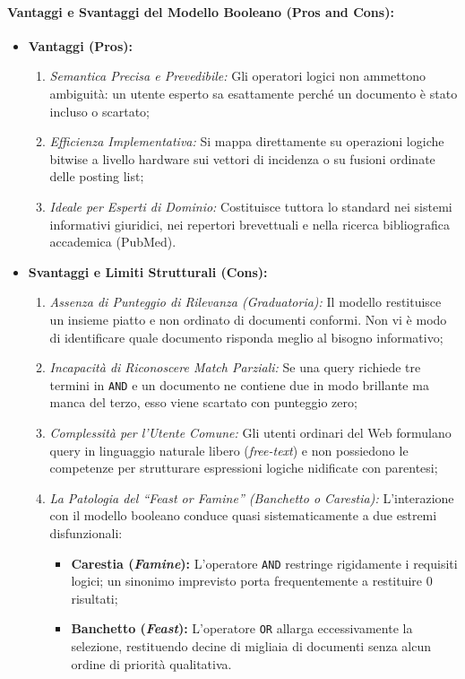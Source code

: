 \paragraph{Vantaggi e Svantaggi del Modello Booleano (Pros and Cons):}
\begin{itemize}
    \item \textbf{Vantaggi (Pros):}
    \begin{enumerate}
        \item \textit{Semantica Precisa e Prevedibile:} Gli operatori logici non ammettono ambiguit\`a: un utente esperto sa esattamente perch\'e un documento \`e stato incluso o scartato;
        \item \textit{Efficienza Implementativa:} Si mappa direttamente su operazioni logiche bitwise a livello hardware sui vettori di incidenza o su fusioni ordinate delle posting list;
        \item \textit{Ideale per Esperti di Dominio:} Costituisce tuttora lo standard nei sistemi informativi giuridici, nei repertori brevettuali e nella ricerca bibliografica accademica (PubMed).
    \end{enumerate}
    \item \textbf{Svantaggi e Limiti Strutturali (Cons):}
    \begin{enumerate}
        \item \textit{Assenza di Punteggio di Rilevanza (Graduatoria):} Il modello restituisce un insieme piatto e non ordinato di documenti conformi. Non vi \`e modo di identificare quale documento risponda meglio al bisogno informativo;
        \item \textit{Incapacit\`a di Riconoscere Match Parziali:} Se una query richiede tre termini in \texttt{AND} e un documento ne contiene due in modo brillante ma manca del terzo, esso viene scartato con punteggio zero;
        \item \textit{Complessit\`a per l'Utente Comune:} Gli utenti ordinari del Web formulano query in linguaggio naturale libero (\textit{free-text}) e non possiedono le competenze per strutturare espressioni logiche nidificate con parentesi;
        \item \textit{La Patologia del ``Feast or Famine'' (Banchetto o Carestia):} L'interazione con il modello booleano conduce quasi sistematicamente a due estremi disfunzionali:
        \begin{itemize}
            \item \textbf{Carestia (\textit{Famine}):} L'operatore \texttt{AND} restringe rigidamente i requisiti logici; un sinonimo imprevisto porta frequentemente a restituire $0$ risultati;
            \item \textbf{Banchetto (\textit{Feast}):} L'operatore \texttt{OR} allarga eccessivamente la selezione, restituendo decine di migliaia di documenti senza alcun ordine di priorit\`a qualitativa.
        \end{itemize}
    \end{enumerate}
\end{itemize}


